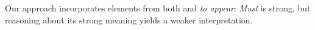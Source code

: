 \documentclass[11pt]{article}
\begin{document}
%
%
%
%
Our approach incorporates elements from both  and \citeauthor{lassiter2014salt} \emph{to appear}: \emph{Must} is strong, but reasoning about its strong meaning yields a weaker interpretation.
\end{document}
